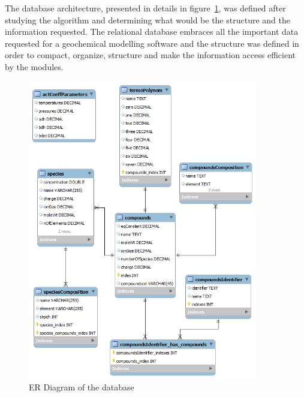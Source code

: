 The database architecture, presented in details in figure~\ref{fig:ERDiagram}, was defined after studying the algorithm and determining what would be the structure and the information requested.  The relational database embraces all the important data requested for a geochemical modelling software and the structure was defined in order to compact, organize, structure and make the information access efficient by the modules. 

\begin{figure}[ht!]
\centering
\includegraphics[width=100mm]{figures/ER_diagram.png}
\caption{ER Diagram of the database}
\label{fig:ERDiagram}
\end{figure}

